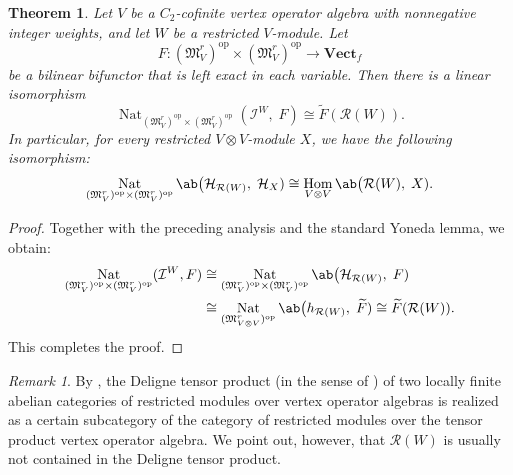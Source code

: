 \documentclass[12pt, english]{article}
\numberwithin{equation}{section}
\DeclareMathOperator{\Hom}{Hom}
\DeclareMathOperator{\opp}{op}
\DeclareMathOperator{\Nat}{Nat}
\theoremstyle{plain}
\newtheorem{theorem}[lemma]{Theorem}
\theoremstyle{definition}
\theoremstyle{remark}
\newtheorem{remark}[lemma]{Remark}
\begin{document}
	\begin{theorem} \label{thm:c2-intertwiner-yoneda}
		Let $V$ be a $C_2$-cofinite vertex operator algebra with nonnegative integer weights,
		and let $W$ be a restricted $V$-module. Let
		\[
		F \colon (\mathfrak{M}^r_V)^{\opp} \times (\mathfrak{M}^r_V)^{\opp} \longrightarrow
		\mathbf{Vect}_f
		\]
		be a bilinear bifunctor that is left exact in each variable. Then there is
		a linear isomorphism
		\begin{equation} \label{eq:c2-yoneda-evaluation}
			\Nat_{(\mathfrak{M}^r_V)^{\opp}\times(\mathfrak{M}^r_V)^{\opp}}(\mathcal{I}^W, \; F) \cong \widetilde{F}(\mathcal{R}(W)).
		\end{equation}
		In particular, for every restricted $V\otimes V$-module $X$, we have the following isomorphism:
		\begin{equation} \label{eq:c2-density-hom}
			\Nat_{(\mathfrak{M}^r_V)^{\opp}\times(\mathfrak{M}^r_V)^{\opp}} \ab\big(\mathcal{H}_{\mathcal{R}(W)}, \; \mathcal{H}_X)
			\cong \Hom_{V \otimes V} \ab\big(\mathcal{R}(W), \; X).
		\end{equation}
		
		
	\end{theorem}
	
	\begin{proof}
		Together with the preceding analysis and the standard Yoneda lemma, we obtain:
		\begin{align*}
			\Nat_{(\mathfrak{M}^r_V)^{\opp}\times(\mathfrak{M}^r_V)^{\opp}}(\mathcal{I}^W, F) & \cong
			\Nat_{(\mathfrak{M}^r_V)^{\opp}\times(\mathfrak{M}^r_V)^{\opp}} \ab\big(\mathcal{H}_{\mathcal{R}(W)}, \; F) \\
			& \cong \Nat_{(\mathfrak{M}^r_{V\otimes V})^{\opp}} \ab\big(h_{\mathcal{R}(W)}, \; \widetilde{F})
			\cong \widetilde{F}(\mathcal{R}(W)).
		\end{align*}
		This completes the proof.
	\end{proof}
	
	\begin{remark}
		By \cite[Theorem~3.15]{McR23}, the Deligne tensor product (in the sense of \cite{EGNO15}) of two locally finite abelian categories of restricted modules over vertex operator algebras is realized as a certain subcategory of the category of restricted modules over the tensor product vertex operator algebra.
		We point out, however, that $\mathcal{R}(W)$ is usually not contained in the Deligne tensor product.
	\end{remark}
	
\end{document}
